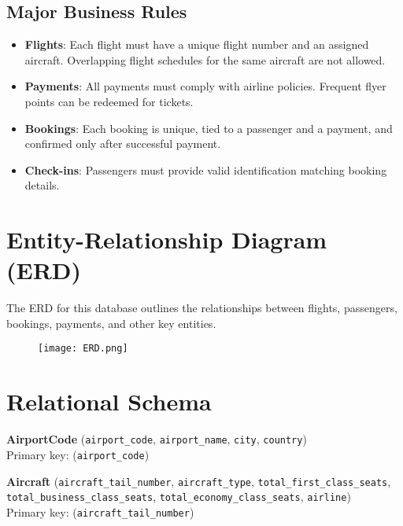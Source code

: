\documentclass[12pt]{article}
\begin{document}
\subsection*{Major Business Rules}
\begin{itemize}
    \item \textbf{Flights}: Each flight must have a unique flight number and an assigned aircraft. Overlapping flight schedules for the same aircraft are not allowed.
    \item \textbf{Payments}: All payments must comply with airline policies. Frequent flyer points can be redeemed for tickets.
    \item \textbf{Bookings}: Each booking is unique, tied to a passenger and a payment, and confirmed only after successful payment.
    \item \textbf{Check-ins}: Passengers must provide valid identification matching booking details.
\end{itemize}

\section*{Entity-Relationship Diagram (ERD)}
The ERD for this database outlines the relationships between flights, passengers, bookings, payments, and other key entities. 

\begin{figure}[H]
    \centering
    \texttt{[image: ERD.png]}
    \label{fig:enter-label}
\end{figure}


\section*{Relational Schema}

\noindent\textbf{AirportCode} (\texttt{airport\_code}, \texttt{airport\_name}, \texttt{city}, \texttt{country}) \\
Primary key: (\texttt{airport\_code})

\vspace{0.3cm}

\noindent\textbf{Aircraft} (\texttt{aircraft\_tail\_number}, \texttt{aircraft\_type}, \texttt{total\_first\_class\_seats}, \\\texttt{total\_business\_class\_seats}, \texttt{total\_economy\_class\_seats}, \texttt{airline}) \\
Primary key: (\texttt{aircraft\_tail\_number})
\end{document}
